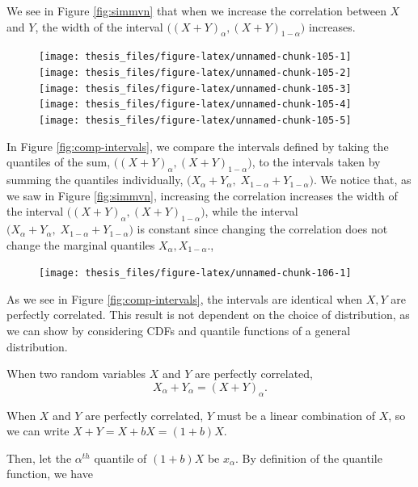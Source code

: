 \documentclass[12pt,twoside]{smiththesis}
\begin{document}
We see in Figure \ref{fig:simmvn} that when we increase the correlation between \(X\) and \(Y\), the width of the interval \(\Big((X+Y)_\alpha, (X+Y)_{1-\alpha}\Big)\) increases.
\begin{figure}

{\centering \texttt{[image: thesis\_files/figure-latex/unnamed-chunk-105-1]} \texttt{[image: thesis\_files/figure-latex/unnamed-chunk-105-2]} \texttt{[image: thesis\_files/figure-latex/unnamed-chunk-105-3]} \texttt{[image: thesis\_files/figure-latex/unnamed-chunk-105-4]} \texttt{[image: thesis\_files/figure-latex/unnamed-chunk-105-5]} 

}

\caption{\label{fig:simmvn}}\label{fig:unnamed-chunk-105}
\end{figure}
In Figure \ref{fig:comp-intervals}, we compare the intervals defined by taking the quantiles of the sum, \(\Big((X+Y)_\alpha, (X+Y)_{1-\alpha}\Big)\), to the intervals taken by summing the quantiles individually, \(\Big(X_\alpha +Y_\alpha, \; X_{1-\alpha} +Y_{1-\alpha}\Big)\). We notice that, as we saw in Figure \ref{fig:simmvn}, increasing the correlation increases the width of the interval \(\Big((X+Y)_\alpha, (X+Y)_{1-\alpha}\Big)\), while the interval \(\Big(X_\alpha +Y_\alpha, \; X_{1-\alpha} +Y_{1-\alpha}\Big)\) is constant since changing the correlation does not change the marginal quantiles \(X_\alpha, X_{1-\alpha}\).,
\begin{figure}

{\centering \texttt{[image: thesis\_files/figure-latex/unnamed-chunk-106-1]} 

}

\caption{\label{fig:comp-intervals}}\label{fig:unnamed-chunk-106}
\end{figure}
As we see in Figure \ref{fig:comp-intervals}, the intervals are identical when \(X,Y\) are perfectly correlated. This result is not dependent on the choice of distribution, as we can show by considering CDFs and quantile functions of a general distribution.
\begin{tcolorbox}[title = Quantiles of the Sum of Perfectly Correlated Random Variables]
When two random variables $X$ and $Y$ are perfectly correlated,
$$X_\alpha + Y_\alpha = (X+Y)_\alpha.$$
\end{tcolorbox}
When \(X\) and \(Y\) are perfectly correlated, \(Y\) must be a linear combination of \(X\), so we can write \(X+Y= X+bX=(1+b)X\).

Then, let the \(\alpha^{th}\) quantile of \((1+b)X\) be \(x_\alpha\). By definition of the quantile function, we have
\end{document}
